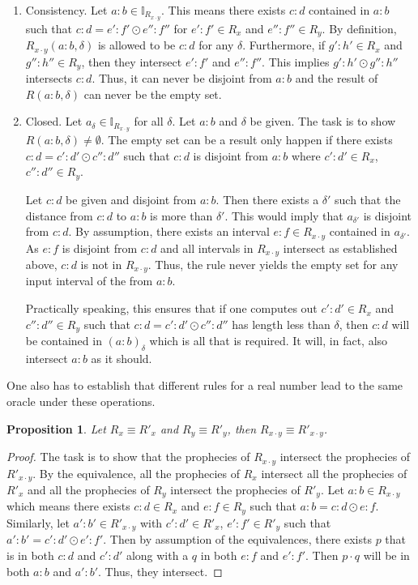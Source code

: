 \documentclass[12pt]{article}
\newtheorem{proposition}{Proposition}[section]
\begin{document}
\begin{enumerate}
    \item Consistency. Let $a:b \in \mathbb{I}_{R_{x\cdot y}}$. This means there exists $c:d$ contained in $a:b$ such that $c:d = e':f' \odot e'':f''$ for $e':f' \in R_x$ and $e'':f'' \in R_y$. By definition, $R_{x \cdot y}(a:b,\delta)$ is allowed to be $ c:d$ for any $\delta$. Furthermore, if $g':h' \in R_x$ and $g'':h'' \in R_y$, then they intersect $e':f'$ and $e'':f''$. This implies $g':h' \odot g'' : h''$ intersects $c:d$. Thus, it can never be disjoint from $a:b$ and the result of $R(a:b, \delta)$ can never be the empty set. 
        
    \item Closed.  Let $a_\delta \in \mathbb{I}_{R_{x\cdot y}}$ for all $\delta$. Let $a:b$ and $\delta$ be given. The task is to show $R(a:b, \delta) \neq \emptyset$. The empty set can be a result only happen if there exists $c:d = c':d' \odot c'':d''$ such that $c:d$ is disjoint from $a:b$ where $c':d' \in R_x$, $c'':d'' \in R_y$. 
    
    Let $c:d$ be given and disjoint from $a:b$. Then there exists a $\delta'$ such that the distance from $c:d$ to $a:b$ is more than $\delta'$. This would imply that $a_{\delta'}$ is disjoint from $c:d$. By assumption, there exists an interval $e:f \in R_{x \cdot y}$ contained in $a_{\delta'}$. As $e:f$ is disjoint from $c:d$ and all intervals in $R_{x \cdot y}$ intersect as established above, $c:d$ is not in $R_{x \cdot y}$. Thus, the rule never yields the empty set for any input interval of the from $a:b$. 

    Practically speaking, this ensures that if one computes out $c':d' \in R_x$ and $c'':d'' \in R_y$ such that $c:d = c':d' \odot c'':d''$ has length less than $\delta$, then $c:d$ will be contained in $(a:b)_\delta$ which is all that is required. It will, in fact, also intersect $a:b$ as it should.
    
\end{enumerate}

One also has to establish that different rules for a real number lead to the same oracle under these operations. 

\begin{proposition}
    Let $R_x \equiv R'_x$ and $R_y \equiv R'_y$, then $R_{x \cdot y} \equiv R'_{x \cdot y}$.
\end{proposition}

\begin{proof}
The task is to show that the prophecies of $R_{x \cdot y}$ intersect the prophecies of $R'_{x \cdot y}$. By the equivalence, all the prophecies of $R_x$ intersect all the prophecies of $R'_x$ and all the prophecies of $R_y$ intersect the prophecies of $R'_y$. Let $a:b \in R_{x \cdot y}$ which means there exists $c:d \in R_x$ and $e:f \in R_y$ such that $a:b = c:d \odot e:f$. Similarly, let $a':b'\in R'_{x \cdot y}$ with $c':d' \in R'_x$, $e':f' \in R'_y$ such that $a':b' = c':d' \odot e':f'$. Then by assumption of the equivalences, there exists $p$ that is in both $c:d$ and $c':d'$ along with a $q$ in both $e:f$ and $e':f'$. Then $p \cdot q$ will be in both $a:b$ and $a':b'$. Thus, they intersect. 
\end{proof}
\end{document}
